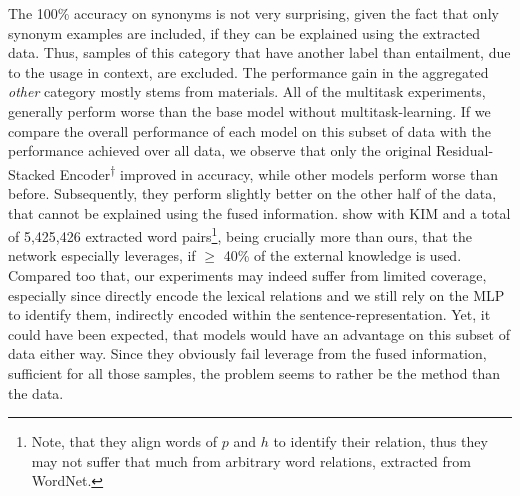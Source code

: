 The 100\% accuracy on synonyms is not very surprising, given the fact that only synonym examples are included, if they can be explained using the extracted data. Thus, samples of this category that have another label than entailment, due to the usage in context, are excluded. The performance gain in the aggregated \textit{other} category mostly stems from materials. All of the multitask experiments, generally perform worse than the base model without multitask-learning. If we compare the overall performance of each model on this subset of data with the performance achieved over all data, we observe that only the original Residual-Stacked Encoder\textsuperscript{$\dagger$} improved in accuracy, while other models perform worse than before. Subsequently, they perform slightly better on the other half of the data, that cannot be explained using the fused information. \cite{chen2017natural} show with \ac{KIM} and a total of 5,425,426 extracted word pairs\footnote{Note, that they align words of $p$ and $h$ to identify their relation, thus they may not suffer that much from arbitrary word relations, extracted from WordNet.}, being crucially more than ours, that the network especially leverages, if $\geq$ 40\% of the external knowledge is used. Compared too that, our experiments may indeed suffer from limited coverage, especially since \cite{chen2017natural} directly encode the lexical relations and we still rely on the \ac{MLP} to identify them, indirectly encoded within the sentence-representation. Yet, it could have been expected, that models would have an advantage on this subset of data either way. Since they obviously fail leverage from the fused information, sufficient for all those samples, the problem seems to rather be the method than the data.

